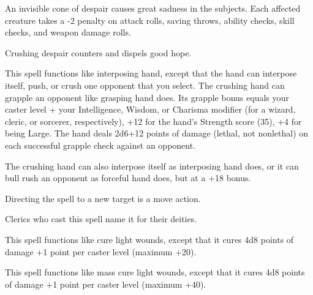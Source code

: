 \begin{multicols}{2}
\begin{small}
\noindent An invisible cone of despair causes great sadness in the subjects. Each affected creature takes a -2 penalty on attack rolls, saving throws, ability checks, skill checks, and weapon damage rolls.

\smallskip\noindent Crushing despair counters and dispels good hope.


\noindent This spell functions like interposing hand, except that the hand can interpose itself, push, or crush one opponent that you select.
The crushing hand can grapple an opponent like grasping hand does. Its grapple bonus equals your caster level + your Intelligence, Wisdom, or Charisma modifier (for a wizard, cleric, or sorcerer, respectively), +12 for the hand's Strength score (35), +4 for being Large. The hand deals 2d6+12 points of damage (lethal, not nonlethal) on each successful grapple check against an opponent.

\smallskip\noindent The crushing hand can also interpose itself as interposing hand does, or it can bull rush an opponent as forceful hand does, but at a +18 bonus.

\smallskip\noindent Directing the spell to a new target is a move action.

\smallskip\noindent Clerics who cast this spell name it for their deities.


\noindent This spell functions like cure light wounds, except that it cures 4d8 points of damage +1 point per caster level (maximum +20).

\noindent This spell functions like mass cure light wounds, except that it cures 4d8 points of damage +1 point per caster level (maximum +40).


\end{small}
\end{multicols}
